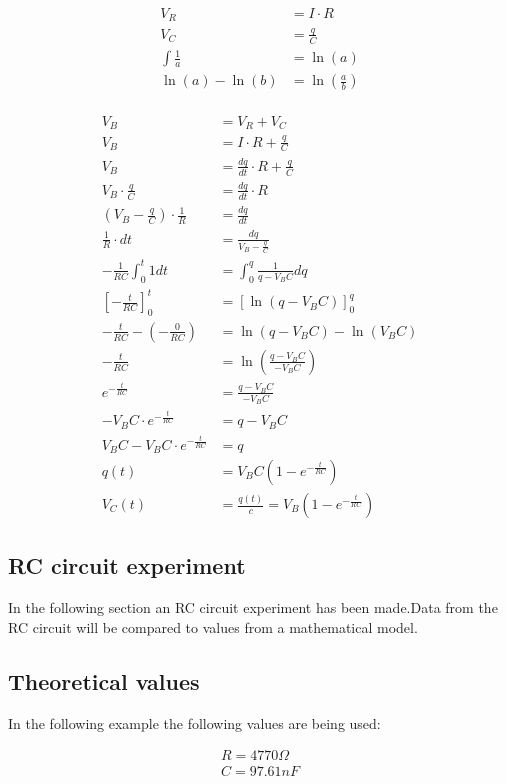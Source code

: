 \begin{align*}
V_R &= I \cdot R \\
V_C &= \frac{q}{C} \\
\int \frac{1}{a} &= \ln(a) \\
\ln(a) - \ln(b) &= \ln(\frac{a}{b})
\end{align*}
\\
\begin{align*}
V_B &= V_R + V_C \\
V_B &= I \cdot R + \frac{q}{C} \\
V_B &= \frac{dq}{dt} \cdot R + \frac{q}{C} \\
V_B \cdot \frac{q}{C} &= \frac{dq}{dt} \cdot R \\
(V_B - \frac{q}{C}) \cdot \frac{1}{R} &= \frac{dq}{dt} \\
\frac{1}{R} \cdot dt &= \frac{dq}{V_B - \frac{q}{C}} \\
- \frac{1}{RC} \int_{0}^{t} 1 dt &= \int_{0}^{q} \frac{1}{q-V_B C}dq \\
[-\frac{t}{RC}]_{0}^{t} &= [\ln(q-V_B C)]_{0}^{q} \\
-\frac{t}{RC} - (-\frac{0}{RC}) &= \ln(q-V_B C) - \ln(V_B C) \\
-\frac{t}{RC} &= \ln(\frac{q-V_B C}{-V_B C}) \\
e^{-\frac{t}{RC}} &= \frac{q-V_B C}{-V_B C} \\
-V_B C \cdot e^{-\frac{t}{RC}} &= q - V_B C \\
V_B C - V_B C \cdot e^{-\frac{t}{RC}} &= q \\
q(t) &= V_B C(1-e^{-\frac{t}{RC}}) \\
V_C(t) &= \frac{q(t)}{c} = V_B (1 - e^{-\frac{t}{RC}})
\end{align*}

\subsection{RC circuit experiment}
In the following section an RC circuit experiment has been made.Data from the RC circuit will be compared to values from a mathematical model. \\

\subsection{Theoretical values}
In the following example the following values are being used:

\begin{align*}
 R = 4770\Omega \\
 C = 97.61nF
\end{align*}

